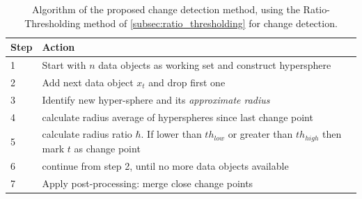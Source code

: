 \begin{center}\begin{table}
\begin{tabular}{ l p{12cm} }
  \hline
  Step & Action \\
  \hline
  1 & Start with $n$ data objects as working set and construct hypersphere \\
  2 & Add next data object $x_t$ and drop first one \\
  3 & Identify new hyper-sphere and its \emph{approximate radius} \\
  4 & calculate radius average of hyperspheres since last change point \\
  5 & calculate radius ratio $\hbar$. If lower than ${th}_{low}$ or greater than ${th}_{high}$ then mark $t$ as change point \\
  6 & continue from step 2, until no more data objects available \\
  7 & Apply post-processing: merge close change points \\
  \hline
\end{tabular}
\caption{Algorithm of the proposed change detection method, using the Ratio-Thresholding method of \ref{subsec:ratio_thresholding} for change detection.}
\label{tab:algorithm_proposed_method}
\end{table}\end{center}

